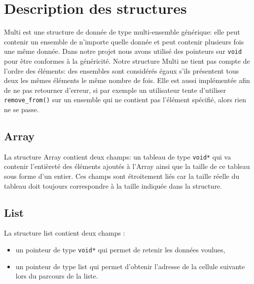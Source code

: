 \documentclass[a4paper, 11pt, oneside]{article}
\begin{document}
	\clearpage
\section{Description des structures}
	Multi est une structure de donnée de type multi-ensemble générique: elle peut contenir un ensemble de n'importe quelle donnée et peut contenir plusieurs fois une même donnée. Dans notre projet nous avons utilisé des pointeurs sur \texttt{void} pour être conformes à la généricité. Notre structure Multi ne tient pas compte de l'ordre des éléments: des ensembles sont considérés égaux s'ils présentent tous deux les mêmes éléments le même nombre de fois. Elle est aussi implémentée afin de ne pas retourner d'erreur, si par exemple un utilisateur tente d'utiliser \texttt{remove\_from()} sur un ensemble qui ne contient pas l'élément spécifié, alors rien ne se passe.
	\subsection{Array}
		La structure Array contient deux champs: un tableau de type \texttt{void*} qui va contenir l'entièreté des éléments ajoutés à l'Array ainsi que la taille de ce tableau sous forme d'un entier. Ces champs sont étroitement liés car la taille réelle du tableau doit toujours correspondre à la taille indiquée dans la structure.
	\subsection{List}
		La structure list contient deux champs :
		\begin{itemize}
			\item un pointeur de type \texttt{void*} qui permet de retenir les données voulues,
			\item un pointeur de type list qui permet d'obtenir l'adresse de la cellule suivante lors du parcours de la liste. 
		\end{itemize}

	
\end{document}
